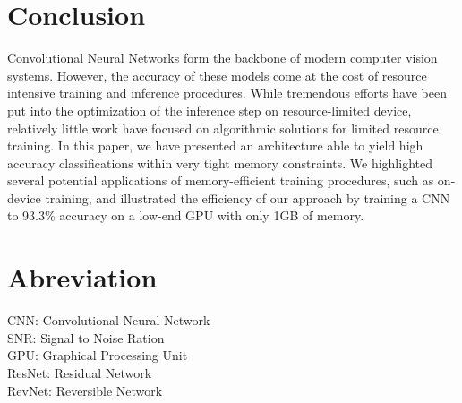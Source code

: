 \documentclass[twocolumn]{bmcart}
\begin{document}
\section{Conclusion}

Convolutional Neural Networks form the backbone of modern computer vision systems.
However, the accuracy of these models come at the cost of resource intensive training and inference procedures.
While tremendous efforts have been put into the optimization of the inference step on resource-limited device,
relatively little work have focused on algorithmic solutions for limited resource training. 
In this paper, we have presented an architecture able to yield high accuracy classifications within very tight memory constraints.
We highlighted several potential applications of memory-efficient training procedures, such as on-device training,
and illustrated the efficiency of our approach by training a CNN to 93.3\% accuracy on a low-end GPU with only 1GB of memory.

\section*{Abreviation}

CNN: Convolutional Neural Network  \\
SNR: Signal to Noise Ration \\
GPU: Graphical Processing Unit \\
ResNet: Residual Network \\
RevNet: Reversible Network
\end{document}
